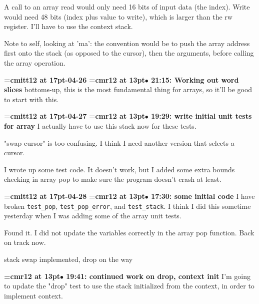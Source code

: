 A call to an array read would only need 16 bits of input data (the index). Write would need 48 bits (index plus value to write), which is larger than the rw register. I'll have to use the context stack.
\par

Note to self, looking at 'ma': the convention would be to push the array address first onto the stack (as opposed to the cursor), then the arguments, before calling the array operation.
\par

{\medskip\noindent\bf\font\titlefont=cmitt12 at 17pt-04-26}\medskip
{\smallskip\noindent\bf\font\titlefont=cmr12 at 13pt\titlefont $\bullet$ 21:15: Working out word slices}\smallskip
bottoms-up, this is the most fundamental thing for arrays, so it'll be good to start with this.
\par

{\medskip\noindent\bf\font\titlefont=cmitt12 at 17pt-04-27}\medskip
{\smallskip\noindent\bf\font\titlefont=cmr12 at 13pt\titlefont $\bullet$ 19:29: write initial unit tests for array}\smallskip
I actually have to use this stack now for these tests.
\par

"swap cursor" is too confusing. I think I need another version that selects a cursor.
\par

I wrote up some test code. It doesn't work, but I added some extra bounds checking in array pop to make sure the program doesn't crash at least.
\par

{\medskip\noindent\bf\font\titlefont=cmitt12 at 17pt-04-28}\medskip
{\smallskip\noindent\bf\font\titlefont=cmr12 at 13pt\titlefont $\bullet$ 17:30: some initial code}\smallskip
I have broken {\tt test\_pop}, {\tt test\_pop\_error}, and {\tt test\_stack}. I think I did this sometime yesterday when I was adding some of the array unit tests.
\par

Found it. I did not update the variables correctly in the array pop function. Back on track now.
\par

stack swap implemented, drop on the way
\par

{\smallskip\noindent\bf\font\titlefont=cmr12 at 13pt\titlefont $\bullet$ 19:41: continued work on drop, context init}\smallskip
I'm going to update the "drop" test to use the stack initialized from the context, in order to implement context.
\par

